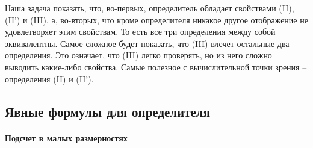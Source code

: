 Наша задача показать, что, во-первых, определитель обладает свойствами  (II), (II') и (III), а, во-вторых, что кроме определителя никакое другое отображение не удовлетворяет этим свойствам.
То есть все три определения между собой эквивалентны.
Самое сложное будет показать, что (III) влечет остальные два определения.
Это означает, что (III) легко проверять, но из него сложно выводить какие-либо свойства.
Самые полезное с вычислительной точки зрения -- определения (II) и (II').


\subsection{Явные формулы для определителя}

\paragraph{Подсчет в малых размерностях}


